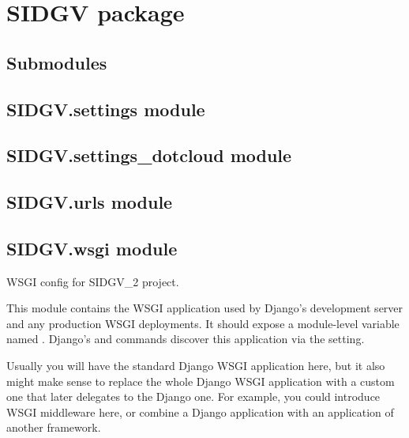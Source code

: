 \documentclass[letterpaper,10pt,english]{sphinxmanual}
\begin{document}
\section{SIDGV package}
\label{SIDGV::doc}\label{SIDGV:sidgv-package}

\subsection{Submodules}
\label{SIDGV:submodules}

\subsection{SIDGV.settings module}
\label{SIDGV:module-SIDGV.settings}\label{SIDGV:sidgv-settings-module}

\begin{fulllineitems}
\label{SIDGV:SIDGV.settings.ugettext}
\end{fulllineitems}



\subsection{SIDGV.settings\_dotcloud module}
\label{SIDGV:sidgv-settings-dotcloud-module}

\subsection{SIDGV.urls module}
\label{SIDGV:sidgv-urls-module}\label{SIDGV:module-SIDGV.urls}

\subsection{SIDGV.wsgi module}
\label{SIDGV:module-SIDGV.wsgi}\label{SIDGV:sidgv-wsgi-module}
WSGI config for SIDGV\_2 project.

This module contains the WSGI application used by Django's development server
and any production WSGI deployments. It should expose a module-level variable
named . Django's  and  commands discover
this application via the  setting.

Usually you will have the standard Django WSGI application here, but it also
might make sense to replace the whole Django WSGI application with a custom one
that later delegates to the Django one. For example, you could introduce WSGI
middleware here, or combine a Django application with an application of another
framework.
\end{document}

